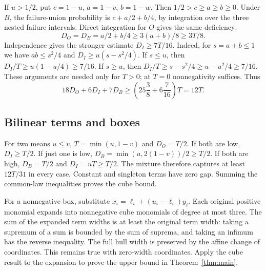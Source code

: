 \documentclass[11pt]{article}
\theoremstyle{remark}
\begin{document}
If $u>1/2$, put $c=1-u$, $a=1-v$, $b=1-w$. Then
$1/2>c\ge a\ge b\ge0$. Under $B$, the failure-union probability
is $c+a/2+b/4$, by integration over the three nested failure intervals.
Direct integration for $O$ gives the same deficiency:
\[
 D_O=D_B=a/2+b/4\ge3(a+b)/8\ge3T/8.
\]
Independence gives the stronger estimate $D_I\ge7T/16$.
Indeed, for $s=a+b\le1$ we have $ab\le s^2/4$ and
$D_I\ge u(s-s^2/4)$. If $s\le u$, then
$D_I/T\ge u(1-u/4)\ge7/16$. If $s\ge u$, then
$D_I/T\ge s-s^2/4\ge u-u^2/4\ge7/16$.
These arguments are needed only for $T>0$; at $T=0$ nonnegativity
suffices. Thus
\[
 18D_O+6D_I+7D_B\ge
 \left(25\frac38+6\frac7{16}\right)T=12T.
\]

\subsection{Bilinear terms and boxes}
For two means $u\le v$, $T=\min(u,1-v)$ and $D_O=T/2$.
If both are low, $D_I\ge T/2$. If just one is low,
$D_B=\min(u,2(1-v))/2\ge T/2$. If both are high,
$D_B=T/2$ and $D_I=uT\ge T/2$. The mixture therefore captures
at least $12T/31$ in every case. Constant and singleton terms have zero
gap. Summing the common-law inequalities proves the cube bound.

For a nonnegative box, substitute $x_i=\ell_i+(u_i-\ell_i)y_i$.
Each original positive monomial expands into nonnegative cube monomials
of degree at most three. The sum of the expanded term widths is at least
the original term width: taking a supremum of a sum is bounded by the
sum of suprema, and taking an infimum has the reverse inequality.
The full hull width is preserved by the affine change of coordinates.
This remains true with zero-width coordinates. Apply the cube result to
the expansion to prove the upper bound in Theorem~\ref{thm:main}.
\end{document}
